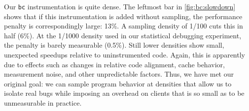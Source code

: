 Our \texttt{bc} instrumentation is quite dense.  The leftmost bar in
\autoref{fig:bc:slowdown} shows that if this instrumentation is added
without sampling, the performance penalty is correspondingly large:
13\%.  A sampling density of 1/100 cuts this in half (6\%).  At the
1/1000 density used in our statistical debugging experiment, the
penalty is barely measurable (0.5\%).  Still lower densities show
small, unexpected speedups relative to uninstrumented code.  Again,
this is apparently due to effects such as changes in relative code
alignment, cache behavior, measurement noise, and other unpredictable
factors.  Thus, we have met our original goal: we can sample program
behavior at densities that allow us to isolate real bugs while
imposing an overhead on clients that is so small as to be unmeasurable
in practice.

